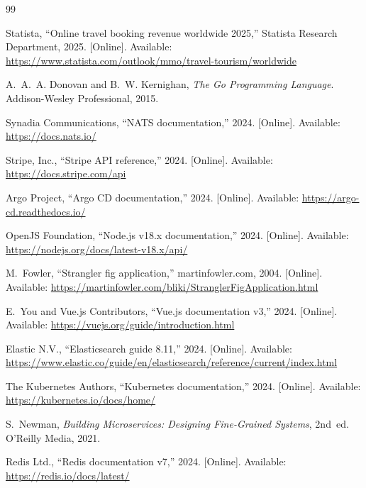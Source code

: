 \documentclass[13pt,a4paper,twoside]{report}
\begin{document}
\begin{thebibliography}{99}

Statista, ``Online travel booking revenue worldwide 2025,''
  Statista Research Department, 2025.
  [Online]. Available: \url{https://www.statista.com/outlook/mmo/travel-tourism/worldwide}

A.~A.~A. Donovan and B.~W. Kernighan,
  \emph{The Go Programming Language}.
  Addison-Wesley Professional, 2015.

Synadia Communications, ``NATS documentation,''
  2024. [Online]. Available: \url{https://docs.nats.io/}

Stripe, Inc., ``Stripe API reference,''
  2024. [Online]. Available: \url{https://docs.stripe.com/api}

Argo Project, ``Argo CD documentation,''
  2024. [Online]. Available: \url{https://argo-cd.readthedocs.io/}

OpenJS Foundation, ``Node.js v18.x documentation,''
  2024. [Online]. Available: \url{https://nodejs.org/docs/latest-v18.x/api/}

M.~Fowler, ``Strangler fig application,''
  martinfowler.com, 2004.
  [Online]. Available: \url{https://martinfowler.com/bliki/StranglerFigApplication.html}

E.~You and Vue.js Contributors, ``Vue.js documentation v3,''
  2024. [Online]. Available: \url{https://vuejs.org/guide/introduction.html}

Elastic N.V., ``Elasticsearch guide 8.11,''
  2024. [Online]. Available: \url{https://www.elastic.co/guide/en/elasticsearch/reference/current/index.html}

The Kubernetes Authors, ``Kubernetes documentation,''
  2024. [Online]. Available: \url{https://kubernetes.io/docs/home/}

S.~Newman,
  \emph{Building Microservices: Designing Fine-Grained Systems}, 2nd~ed.
  O'Reilly Media, 2021.

Redis Ltd., ``Redis documentation v7,''
  2024. [Online]. Available: \url{https://redis.io/docs/latest/}

\end{thebibliography}
\end{document}
